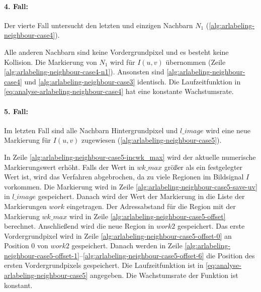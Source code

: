 \paragraph{4. Fall:} %
\label{par:fall_4_}
Der vierte Fall untersucht den letzten und einzigen Nachbarn $N_1$ (\autoref{alg:arlabeling-neighbour-case4}).

Alle anderen Nachbarn sind keine Vordergrundpixel und es besteht keine Kollision. Die Markierung von $N_1$ wird für
 $I(u,v)$ übernommen (Zeile \ref{alg:arlabeling-neighbour-case4-n1}). Ansonsten sind
 \autoref{alg:arlabeling-neighbour-case4} und \autoref{alg:arlabeling-neighbour-case3} identisch. Die Laufzeitfunktion
 in \autoref{eq:analyse-arlabeling-neighbour-case4} hat eine konstante Wachstumsrate.


\paragraph{5. Fall:} %
\label{par:fall_5_}
Im letzten Fall sind alle Nachbarn Hintergrundpixel und $\mathit{l\_image}$ wird eine neue Markierung für $I(u,v)$
 zugewiesen (\autoref{alg:arlabeling-neighbour-case5}).

In Zeile \ref{alg:arlabeling-neighbour-case5-incwk_max} wird der aktuelle numerische Markierungswert erhöht. Falls der
 Wert in $\mathit{wk\_max}$ größer als ein festgelegter Wert ist, wird das Verfahren abgebrochen, da zu viele Regionen
 im Bildsignal $I$ vorkommen. Die Markierung wird in Zeile \ref{alg:arlabeling-neighbour-case5-save-uv} in
 $\mathit{l\_image}$ gespeichert. Danach wird der Wert der Markierung in die Liste der Markierungen $\mathit{work}$
 eingetragen. Der Adressabstand für die Region mit der Markierung $\mathit{wk\_max}$ wird in Zeile
 \ref{alg:arlabeling-neighbour-case5-offset} berechnet. Anschließend wird die neue Region in $\mathit{work2}$
 gespeichert. Das erste Vordergrundpixel wird in Zeile \ref{alg:arlabeling-neighbour-case5-offset-0} an Position $0$
 von $\mathit{work2}$ gespeichert. Danach werden in Zeile
 \ref{alg:arlabeling-neighbour-case5-offset-1}--\ref{alg:arlabeling-neighbour-case5-offset-6} die Position des ersten
 Vordergrundpixels gespeichert. Die Laufzeitfunktion ist in \autoref{eq:analyse-arlabeling-neighbour-case5} angegeben.
 Die Wachstumsrate der Funktion ist konstant.


